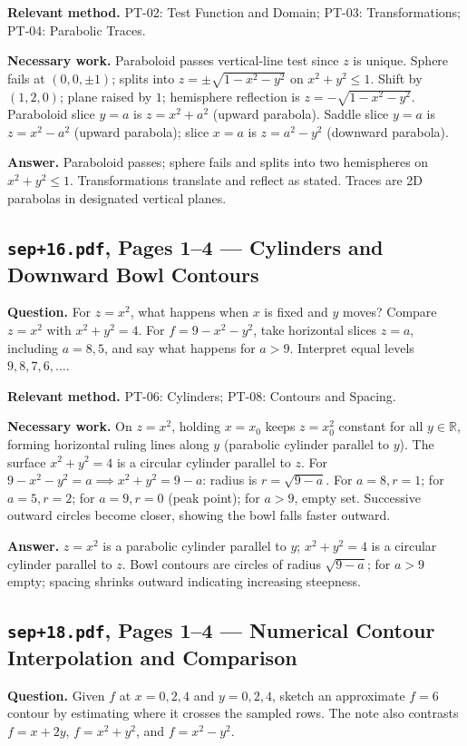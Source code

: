 \documentclass[11pt,letterpaper]{article}
\newcommand{\R}{\mathbb{R}}
\begin{document}
\textbf{Relevant method.} PT-02: Test Function and Domain; PT-03: Transformations; PT-04: Parabolic Traces.

\textbf{Necessary work.}
Paraboloid passes vertical-line test since $z$ is unique. Sphere fails at $(0,0,\pm 1)$; splits into $z = \pm\sqrt{1-x^2-y^2}$ on $x^2+y^2\le 1$. Shift by $(1,2,0)$; plane raised by $1$; hemisphere reflection is $z = -\sqrt{1-x^2-y^2}$. Paraboloid slice $y=a$ is $z = x^2+a^2$ (upward parabola). Saddle slice $y=a$ is $z = x^2-a^2$ (upward parabola); slice $x=a$ is $z = a^2-y^2$ (downward parabola).

\textbf{Answer.}
Paraboloid passes; sphere fails and splits into two hemispheres on $x^2+y^2\le 1$. Transformations translate and reflect as stated. Traces are 2D parabolas in designated vertical planes.

\subsection{\texttt{sep+16.pdf}, Pages 1--4 --- Cylinders and Downward Bowl Contours}
\textbf{Question.} For $z = x^2$, what happens when $x$ is fixed and $y$ moves? Compare $z = x^2$ with $x^2 + y^2 = 4$. For $f = 9 - x^2 - y^2$, take horizontal slices $z = a$, including $a = 8, 5$, and say what happens for $a > 9$. Interpret equal levels $9, 8, 7, 6, \dots$.

\textbf{Relevant method.} PT-06: Cylinders; PT-08: Contours and Spacing.

\textbf{Necessary work.}
On $z = x^2$, holding $x=x_0$ keeps $z=x_0^2$ constant for all $y \in \R$, forming horizontal ruling lines along $y$ (parabolic cylinder parallel to $y$). The surface $x^2+y^2=4$ is a circular cylinder parallel to $z$.
For $9 - x^2 - y^2 = a \implies x^2+y^2 = 9-a$: radius is $r = \sqrt{9-a}$. For $a=8, r=1$; for $a=5, r=2$; for $a=9, r=0$ (peak point); for $a>9$, empty set. Successive outward circles become closer, showing the bowl falls faster outward.

\textbf{Answer.}
$z=x^2$ is a parabolic cylinder parallel to $y$; $x^2+y^2=4$ is a circular cylinder parallel to $z$. Bowl contours are circles of radius $\sqrt{9-a}$; for $a>9$ empty; spacing shrinks outward indicating increasing steepness.

\subsection{\texttt{sep+18.pdf}, Pages 1--4 --- Numerical Contour Interpolation and Comparison}
\textbf{Question.} Given $f$ at $x = 0, 2, 4$ and $y = 0, 2, 4$, sketch an approximate $f = 6$ contour by estimating where it crosses the sampled rows. The note also contrasts $f = x + 2y$, $f = x^2 + y^2$, and $f = x^2 - y^2$.
\end{document}
